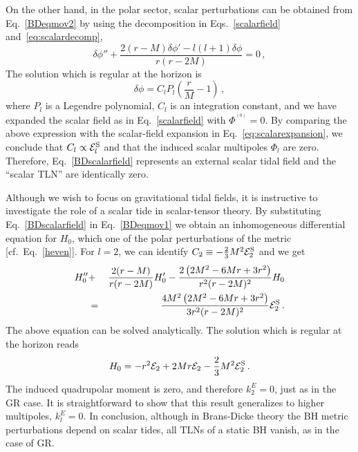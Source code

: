 \documentclass[aps,twocolumn,showpacs,preprintnumbers,nofootinbib,prd,superscriptaddress,groupedaddress,10pt]{revtex4-1}
\def\nn{\nonumber}
\begin{document}
On the other hand, in the polar sector, scalar perturbations can be obtained from Eq.~\eqref{BDeqmov2} by using the decomposition in Eqs.~\eqref{scalarfield} and~\eqref{eq:scalardecomp},
%
\begin{equation}
\delta\phi''+\frac{2 (r-M) \delta\phi'-l (l+1) \delta\phi}{r (r-2 M)}=0\,,
\end{equation}
%
The solution which is regular at the horizon is
%
\begin{equation}
\label{BDscalarfield}
\delta\phi= C_l P_l\left(\frac{r}{M}-1\right)\,,
\end{equation}
%
where $P_l$ is a Legendre polynomial, $C_l$ is an integration constant, and we have expanded the scalar field as in Eq.~\eqref{scalarfield} with $\Phi^{^{(0)}}=0$. By comparing the above expression with the scalar-field expansion in Eq.~\eqref{eq:scalarexpansion}, we conclude that $C_l\propto \mathcal{E}_l^{\rm S}$ and that the induced scalar multipoles $\Phi_l$ are zero. Therefore, Eq.~\eqref{BDscalarfield} represents an external scalar tidal field and the ``scalar TLN'' are identically zero.

Although we wish to focus on gravitational tidal fields, it is instructive to investigate the role of a scalar tide in scalar-tensor theory. By substituting Eq.~\eqref{BDscalarfield} in Eq.~\eqref{BDeqmov1} we obtain an inhomogeneous differential equation for $H_0$, which one of the polar perturbations of the metric [cf.\ Eq.~\eqref{heven}]. For $l=2$, we can identify $C_2\equiv -\frac{2}{3} M^2 \mathcal{E}_2^{\rm S}$ and we get
%
\begin{eqnarray}
H_0''&+&\frac{2 (r-M)}{r (r-2 M)}H_0'-\frac{2 \left(2 M^2-6 M r+3 r^2\right)}{r^2 (r-2 M)^2}H_0\nn\\
&=&\frac{4M^2 \left(2 M^2-6 M r+3 r^2\right)}{3r^2 (r-2 M)^2} \mathcal{E}_2^{\rm S}\,.\label{difeqH0BD}
\end{eqnarray}
%
The above equation can be solved analytically. The solution which is regular at the horizon reads
%
\begin{equation}
\label{solHBD}
H_0=-r^2 \mathcal{E}_2+2 M r \mathcal{E}_2-\frac{2}{3} M^2 \mathcal{E}^{\rm S}_2\,.
\end{equation}
%
The induced quadrupolar moment is zero, and therefore $k^E_{2}=0$, just as in the GR case.
%
It is straightforward to show that this result generalizes to higher multipoles, $k^E_l=0$.
%
In conclusion, although in Brans-Dicke theory the BH metric perturbations depend on scalar tides, all TLNs of a static BH vanish, as in the case of GR.
\end{document}
